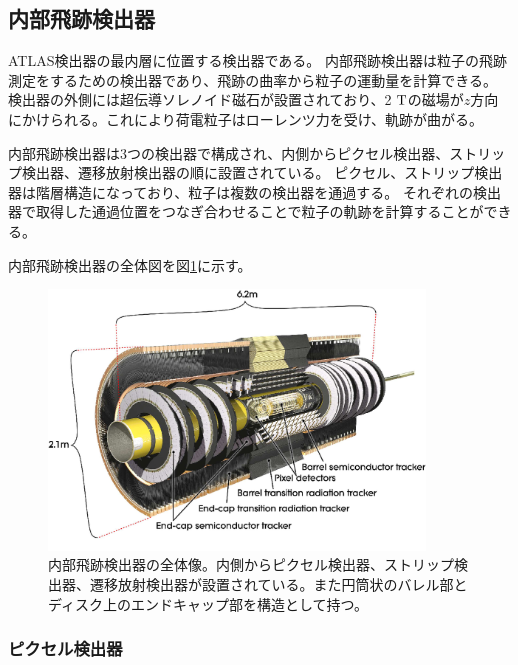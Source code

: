 \subsection{内部飛跡検出器}
ATLAS検出器の最内層に位置する検出器である。
内部飛跡検出器は粒子の飛跡測定をするための検出器であり、飛跡の曲率から粒子の運動量を計算できる。
検出器の外側には超伝導ソレノイド磁石が設置されており、2 $\rm{T}$の磁場が$z$方向にかけられる。これにより荷電粒子はローレンツ力を受け、軌跡が曲がる。

内部飛跡検出器は3つの検出器で構成され、内側からピクセル検出器、ストリップ検出器、遷移放射検出器の順に設置されている。
ピクセル、ストリップ検出器は階層構造になっており、粒子は複数の検出器を通過する。
それぞれの検出器で取得した通過位置をつなぎ合わせることで粒子の軌跡を計算することができる。

内部飛跡検出器の全体図を図\ref{inner_detector}に示す。

\begin{figure}[bpt]\centering
\includegraphics[width=10cm]{./inner_detector.png}
\caption[内部飛跡検出器の全体像]{内部飛跡検出器の全体像\cite{1-2}。内側からピクセル検出器、ストリップ検出器、遷移放射検出器が設置されている。また円筒状のバレル部とディスク上のエンドキャップ部を構造として持つ。}
\label{inner_detector}
\end{figure}


%

\subsubsection{ピクセル検出器}

